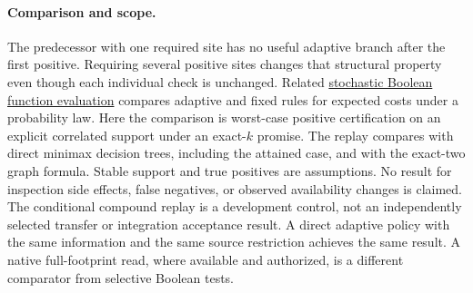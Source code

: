 \documentclass[11pt]{article}
\begin{document}
\paragraph{Comparison and scope.}
The predecessor with one required site has no useful adaptive branch after the first positive. Requiring several positive sites changes that structural property even though each individual check is unchanged. Related \href{https://arxiv.org/abs/2208.03810}{stochastic Boolean function evaluation} compares adaptive and fixed rules for expected costs under a probability law. Here the comparison is worst-case positive certification on an explicit correlated support under an exact-$k$ promise. The replay compares with direct minimax decision trees, including the attained case, and with the exact-two graph formula. Stable support and true positives are assumptions. No result for inspection side effects, false negatives, or observed availability changes is claimed. The conditional compound replay is a development control, not an independently selected transfer or integration acceptance result. A direct adaptive policy with the same information and the same source restriction achieves the same result. A native full-footprint read, where available and authorized, is a different comparator from selective Boolean tests.
\end{document}
